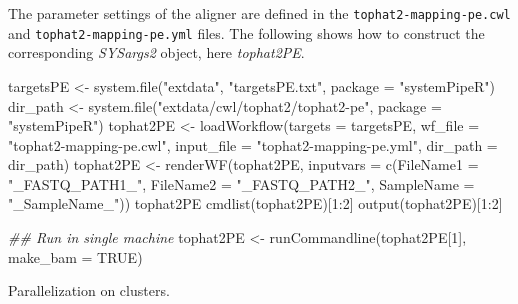 \documentclass[14pt,]{article}
\newcommand{\hlnum}[1]{\textcolor[rgb]{0.816,0.125,0.439}{#1}}%
\newcommand{\hlstr}[1]{\textcolor[rgb]{0.251,0.627,0.251}{#1}}%
\newcommand{\hlcom}[1]{\textcolor[rgb]{0.502,0.502,0.502}{\textit{#1}}}%
\newcommand{\hlopt}[1]{\textcolor[rgb]{0,0,0}{#1}}%
\newcommand{\hlstd}[1]{\textcolor[rgb]{0.251,0.251,0.251}{#1}}%
\newcommand{\hlkwc}[1]{\textcolor[rgb]{0.251,0.251,0.251}{#1}}%
\newcommand{\hlkwd}[1]{\textcolor[rgb]{0.878,0.439,0.125}{#1}}%
\newenvironment{Shaded}{\begin{myshaded}}{\end{myshaded}}
\newcommand{\KeywordTok}[1]{\hlkwd{#1}}
\newcommand{\DataTypeTok}[1]{\hlkwc{#1}}
\newcommand{\DecValTok}[1]{\hlnum{#1}}
\newcommand{\StringTok}[1]{\hlstr{#1}}
\newcommand{\CommentTok}[1]{\hlcom{#1}}
\newcommand{\OtherTok}[1]{{#1}}
\newcommand{\OperatorTok}[1]{\hlopt{#1}}
\newcommand{\NormalTok}[1]{\hlstd{#1}}
\begin{document}
The parameter settings of the aligner are defined in the \texttt{tophat2-mapping-pe.cwl}
and \texttt{tophat2-mapping-pe.yml} files. The following shows how to construct the
corresponding \emph{SYSargs2} object, here \emph{tophat2PE}.

\begin{Shaded}
\begin{Highlighting}[]
\NormalTok{targetsPE <-}\StringTok{ }\KeywordTok{system.file}\NormalTok{(}\StringTok{"extdata"}\NormalTok{, }\StringTok{"targetsPE.txt"}\NormalTok{, }\DataTypeTok{package =} \StringTok{"systemPipeR"}\NormalTok{)}
\NormalTok{dir_path <-}\StringTok{ }\KeywordTok{system.file}\NormalTok{(}\StringTok{"extdata/cwl/tophat2/tophat2-pe"}\NormalTok{, }\DataTypeTok{package =} \StringTok{"systemPipeR"}\NormalTok{)}
\NormalTok{tophat2PE <-}\StringTok{ }\KeywordTok{loadWorkflow}\NormalTok{(}\DataTypeTok{targets =}\NormalTok{ targetsPE, }\DataTypeTok{wf_file =} \StringTok{"tophat2-mapping-pe.cwl"}\NormalTok{, }
    \DataTypeTok{input_file =} \StringTok{"tophat2-mapping-pe.yml"}\NormalTok{, }\DataTypeTok{dir_path =}\NormalTok{ dir_path)}
\NormalTok{tophat2PE <-}\StringTok{ }\KeywordTok{renderWF}\NormalTok{(tophat2PE, }\DataTypeTok{inputvars =} \KeywordTok{c}\NormalTok{(}\DataTypeTok{FileName1 =} \StringTok{"_FASTQ_PATH1_"}\NormalTok{, }\DataTypeTok{FileName2 =} \StringTok{"_FASTQ_PATH2_"}\NormalTok{, }
    \DataTypeTok{SampleName =} \StringTok{"_SampleName_"}\NormalTok{))}
\NormalTok{tophat2PE}
\KeywordTok{cmdlist}\NormalTok{(tophat2PE)[}\DecValTok{1}\OperatorTok{:}\DecValTok{2}\NormalTok{]}
\KeywordTok{output}\NormalTok{(tophat2PE)[}\DecValTok{1}\OperatorTok{:}\DecValTok{2}\NormalTok{]}

\CommentTok{## Run in single machine}
\NormalTok{tophat2PE <-}\StringTok{ }\KeywordTok{runCommandline}\NormalTok{(tophat2PE[}\DecValTok{1}\NormalTok{], }\DataTypeTok{make_bam =} \OtherTok{TRUE}\NormalTok{)}
\end{Highlighting}
\end{Shaded}

Parallelization on clusters.
\end{document}
